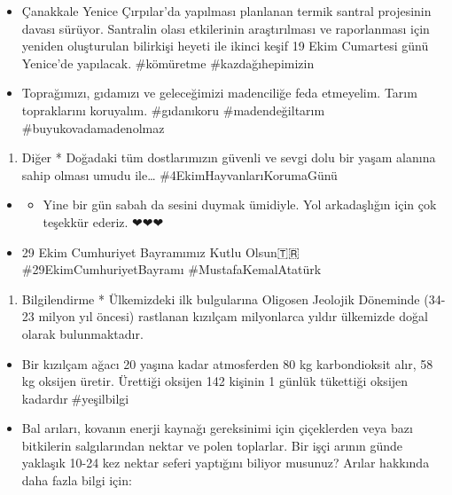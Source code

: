 \documentclass[
]{book}
\providecommand{\tightlist}{%
  \setlength{\itemsep}{0pt}\setlength{\parskip}{0pt}}
\begin{document}
\begin{itemize}
\item
  Çanakkale Yenice Çırpılar'da yapılması planlanan termik santral projesinin davası sürüyor. Santralin olası etkilerinin araştırılması ve raporlanması için yeniden oluşturulan bilirkişi heyeti ile ikinci keşif 19 Ekim Cumartesi günü Yenice'de yapılacak. \#kömüretme \#kazdağıhepimizin
\item
  Toprağımızı, gıdamızı ve geleceğimizi madenciliğe feda etmeyelim. Tarım topraklarını koruyalım. \#gıdanıkoru \#madendeğiltarım \#buyukovadamadenolmaz
\end{itemize}

\begin{enumerate}
\def\labelenumi{\arabic{enumi})}
\setcounter{enumi}{5}
\tightlist
\item
  Diğer * Doğadaki tüm dostlarımızın güvenli ve sevgi dolu bir yaşam alanına sahip olması umudu ile\ldots{} \#4EkimHayvanlarıKorumaGünü
\end{enumerate}

\begin{itemize}
\item
  \begin{itemize}
  \tightlist
  \item
    \citet{mcantonbil} Yine bir gün sabah \citet{acikradyo} da sesini duymak ümidiyle. Yol arkadaşlığın için çok teşekkür ederiz. ❤❤❤
  \end{itemize}
\item
  29 Ekim Cumhuriyet Bayramımız Kutlu Olsun🇹🇷 \#29EkimCumhuriyetBayramı \#MustafaKemalAtatürk
\end{itemize}

\begin{enumerate}
\def\labelenumi{\arabic{enumi})}
\setcounter{enumi}{6}
\tightlist
\item
  Bilgilendirme * Ülkemizdeki ilk bulgularına Oligosen Jeolojik Döneminde (34-23 milyon yıl öncesi) rastlanan kızılçam milyonlarca yıldır ülkemizde doğal olarak bulunmaktadır.
\end{enumerate}

\begin{itemize}
\item
  Bir kızılçam ağacı 20 yaşına kadar atmosferden 80 kg karbondioksit alır, 58 kg oksijen üretir. Ürettiği oksijen 142 kişinin 1 günlük tükettiği oksijen kadardır🌳\#yeşilbilgi
\item
  Bal arıları, kovanın enerji kaynağı gereksinimi için çiçeklerden veya bazı bitkilerin salgılarından nektar ve polen toplarlar. Bir işçi arının günde yaklaşık 10-24 kez nektar seferi yaptığını biliyor musunuz? Arılar hakkında daha fazla bilgi için:
\end{itemize}
\end{document}
